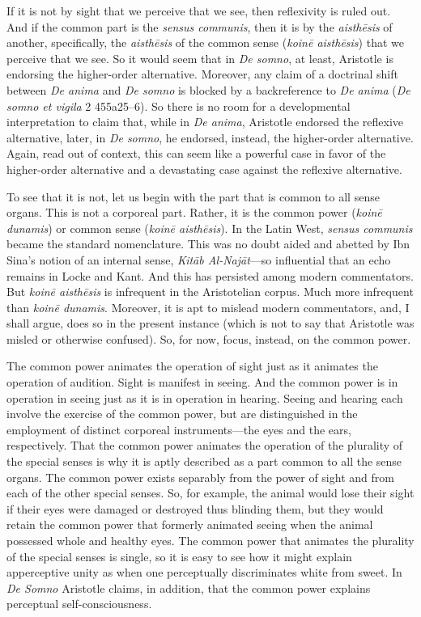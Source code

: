If it is not by sight that we perceive that we see, then reflexivity is ruled out. And if the common part is the \emph{sensus communis}, then it is by the \emph{aisthēsis} of another, specifically, the \emph{aisthēsis} of the common sense (\emph{koinē aisthēsis}) that we perceive that we see. So it would seem that in \emph{De somno}, at least, Aristotle is endorsing the higher-order alternative. Moreover, any claim of a doctrinal shift between \emph{De anima} and \emph{De somno} is blocked by a backreference to \emph{De anima} (\emph{De somno et vigila} 2 455a25–6). So there is no room for a developmental interpretation to claim that, while in \emph{De anima}, Aristotle endorsed the reflexive alternative, later, in \emph{De somno}, he endorsed, instead, the higher-order alternative. Again, read out of context, this can seem like a powerful case in favor of the higher-order alternative and a devastating case against the reflexive alternative.

To see that it is not, let us begin with the part that is common to all sense organs. This is not a corporeal part. Rather, it is the common power (\emph{koinē dunamis}) or common sense (\emph{koinē aisthēsis}). In the Latin West, \emph{sensus communis} became the standard nomenclature. This was no doubt aided and abetted by Ibn Sina's notion of an internal sense, \emph{Kitāb Al-Najāt}—so influential that an echo remains in Locke and Kant. And this has persisted among modern commentators. But \emph{koinē aisthēsis} is infrequent in the Aristotelian corpus. Much more infrequent than \emph{koinē dunamis}. Moreover, it is apt to mislead modern commentators, and, I shall argue, does so in the present instance (which is not to say that Aristotle was misled or otherwise confused). So, for now, focus, instead, on the common power.

The common power animates the operation of sight just as it animates the operation of audition. Sight is manifest in seeing. And the common power is in operation in seeing just as it is in operation in hearing. Seeing and hearing each involve the exercise of the common power, but are distinguished in the employment of distinct corporeal instruments—the eyes and the ears, respectively. That the common power animates the operation of the plurality of the special senses is why it is aptly described as a part common to all the sense organs. The common power exists separably from the power of sight and from each of the other special senses. So, for example, the animal would lose their sight if their eyes were damaged or destroyed thus blinding them, but they would retain the common power that formerly animated seeing when the animal possessed whole and healthy eyes. The common power that animates the plurality of the special senses is single, so it is easy to see how it might explain apperceptive unity as when one perceptually discriminates white from sweet. In \emph{De Somno} Aristotle claims, in addition, that the common power explains perceptual self-consciousness.

